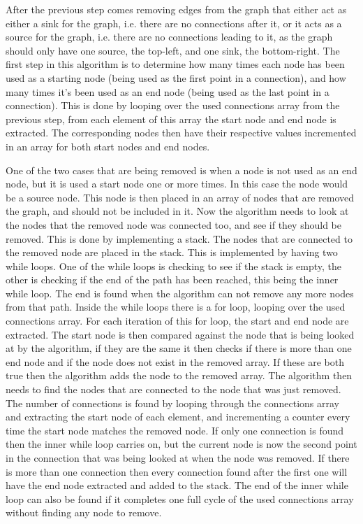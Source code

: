 	After the previous step comes removing edges from the graph that either act as either a sink for the graph, i.e. there are no connections after it, or it acts as a source for the graph, i.e. there are no connections leading to it, as the graph should only have one source, the top-left, and one sink, the bottom-right. The first step in this algorithm is to determine how many times each node has been used as a starting node (being used as the first point in a connection), and how many times it's been used as an end node (being used as the last point in a connection). This is done by looping over the used connections array from the previous step, from each element of this array the start node and end node is extracted. The corresponding nodes then have their respective values incremented in an array for both start nodes and end nodes.
	\newline
	\par
	One of the two cases that are being removed is when a node is not used as an end node, but it is used a start node one or more times. In this case the node would be a source node. This node is then placed in an array of nodes that are removed the graph, and should not be included in it. Now the algorithm needs to look at the nodes that the removed node was connected too, and see if they should be removed. This is done by implementing a stack. The nodes that are connected to the removed node are placed in the stack. This is implemented by having two while loops. One of the while loops is checking to see if the stack is empty, the other is checking if the end of the path has been reached, this being the inner while loop. The end is found when the algorithm can not remove any more nodes from that path. Inside the while loops there is a for loop, looping over the used connections array. For each iteration of this for loop, the start and end node are extracted. The start node is then compared against the node that is being looked at by the algorithm, if they are the same it then checks if there is more than one end node and if the node does not exist in the removed array. If these are both true then the algorithm adds the node to the removed array. The algorithm then needs to find the nodes that are connected to the node that was just removed. The number of connections is found by looping through the connections array and extracting the start node of each element, and incrementing a counter every time the start node matches the removed node. If only one connection is found then the inner while loop carries on, but the current node is now the second point in the connection that was being looked at when the node was removed. If there is more than one connection then every connection found after the first one will have the end node extracted and added to the stack. The end of the inner while loop can also be found if it completes one full cycle of the used connections array without finding any node to remove.
